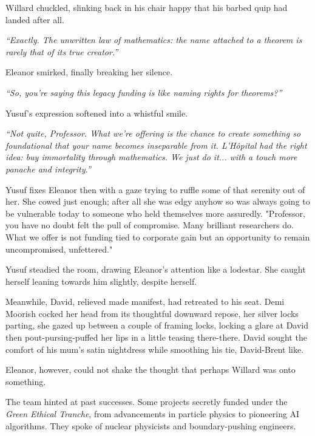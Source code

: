Willard chuckled, slinking back in his chair happy that his barbed quip had landed after all. 

\textit{“Exactly. The unwritten law of mathematics: the name attached to a theorem is rarely that of its true creator.”}
\smallskip 

Eleanor smirked, finally breaking her silence. 

\textit{“So, you’re saying this legacy funding is like naming rights for theorems?”}
\smallskip 

Yusuf’s expression softened into a whistful smile. 

\textit{“Not quite, Professor. What we’re offering is the chance to create something so foundational that your name becomes inseparable from it. L’Hôpital had the right idea: buy immortality through mathematics. We just do it... with a touch more panache and integrity.”}

\smallskip 

Yusuf fixes Eleanor then with a gaze trying to ruffle some of that serenity out of her. She cowed just enough; after all she was edgy anyhow so was always going to be vulnerable today to someone who held themselves more assuredly. "Professor, you have no doubt felt the pull of compromise. Many brilliant researchers do. What we offer is not funding tied to corporate gain but an opportunity to remain uncompromised, unfettered."

\smallskip 

Yusuf steadied the room, drawing Eleanor’s attention like a lodestar. She caught herself leaning towards him slightly, despite herself. 

\smallskip

Meanwhile, David, relieved made manifest, had retreated to his seat. Demi Moorish cocked her head from its thoughtful downward repose, her silver locks parting, she gazed up between a couple of framing locks, locking a glare at David then pout-pursing-puffed her lips in a little teasing there-there. David sought the comfort of his mum's satin nightdress while smoothing his tie, David-Brent like.

\smallskip

Eleanor, however, could not shake the thought that perhaps Willard was onto something.

The team hinted at past successes. Some projects secretly funded under the \textit{Green Ethical Tranche}, from advancements in particle physics to pioneering AI algorithms. They spoke of nuclear physicists and boundary-pushing engineers.

